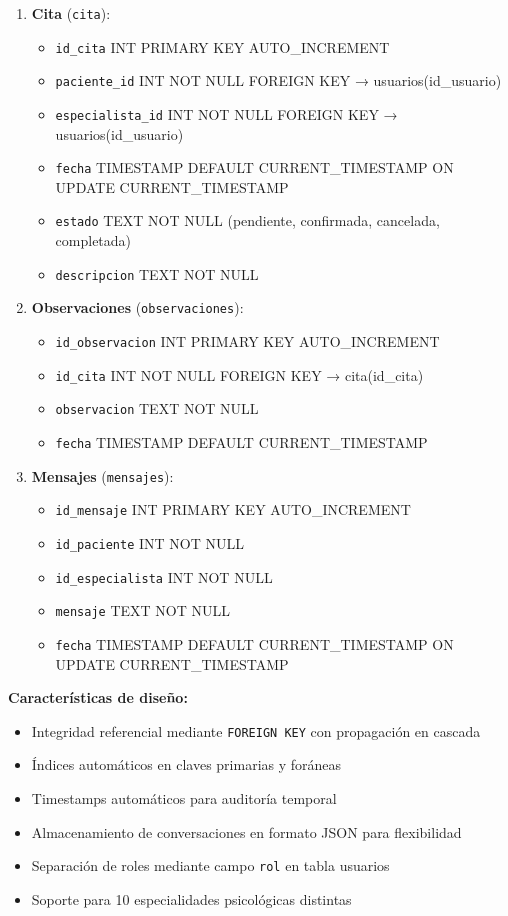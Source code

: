 \documentclass[12pt,a4paper]{report}
\numberwithin{figure}{section}
\begin{document}
\begin{enumerate}
  \item \textbf{Cita} (\texttt{cita}):
  \begin{itemize}
    \item \texttt{id\_cita} INT PRIMARY KEY AUTO\_INCREMENT
    \item \texttt{paciente\_id} INT NOT NULL FOREIGN KEY → usuarios(id\_usuario)
    \item \texttt{especialista\_id} INT NOT NULL FOREIGN KEY → usuarios(id\_usuario)
    \item \texttt{fecha} TIMESTAMP DEFAULT CURRENT\_TIMESTAMP ON UPDATE CURRENT\_TIMESTAMP
    \item \texttt{estado} TEXT NOT NULL (pendiente, confirmada, cancelada, completada)
    \item \texttt{descripcion} TEXT NOT NULL
  \end{itemize}
  
  \item \textbf{Observaciones} (\texttt{observaciones}):
  \begin{itemize}
    \item \texttt{id\_observacion} INT PRIMARY KEY AUTO\_INCREMENT
    \item \texttt{id\_cita} INT NOT NULL FOREIGN KEY → cita(id\_cita)
    \item \texttt{observacion} TEXT NOT NULL
    \item \texttt{fecha} TIMESTAMP DEFAULT CURRENT\_TIMESTAMP
  \end{itemize}
  
  \item \textbf{Mensajes} (\texttt{mensajes}):
  \begin{itemize}
    \item \texttt{id\_mensaje} INT PRIMARY KEY AUTO\_INCREMENT
    \item \texttt{id\_paciente} INT NOT NULL
    \item \texttt{id\_especialista} INT NOT NULL
    \item \texttt{mensaje} TEXT NOT NULL
    \item \texttt{fecha} TIMESTAMP DEFAULT CURRENT\_TIMESTAMP ON UPDATE CURRENT\_TIMESTAMP
  \end{itemize}
\end{enumerate}

\textbf{Características de diseño:}
\begin{itemize}
  \item Integridad referencial mediante \texttt{FOREIGN KEY} con propagación en cascada
  \item Índices automáticos en claves primarias y foráneas
  \item Timestamps automáticos para auditoría temporal
  \item Almacenamiento de conversaciones en formato JSON para flexibilidad
  \item Separación de roles mediante campo \texttt{rol} en tabla usuarios
  \item Soporte para 10 especialidades psicológicas distintas
\end{itemize}
\end{document}
